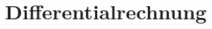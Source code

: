 \documentclass[../main.tex]{subfiles}
\begin{document}
\chapter{Differentialrechnung}
\end{document}

